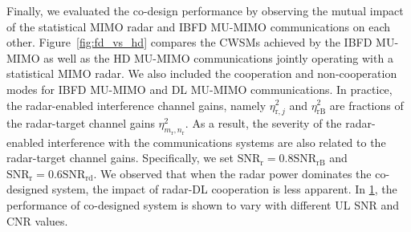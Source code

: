 \documentclass[10pt,journal]{IEEEtran}
\newcommand{\paren}[1]{\left({#1}\right)}
\newcommand{\rr}{_\mathrm{r}}
\theoremstyle{definition}
\begin{document}
{\begin{figure}[t]
\label{fig:joint}
\end{figure}

Finally, we evaluated the co-design performance by observing the mutual impact of the statistical MIMO radar and IBFD MU-MIMO communications on each other. Figure~\ref{fig:fd_vs_hd} compares the CWSMs achieved by the IBFD MU-MIMO as well as the HD MU-MIMO communications jointly operating with a statistical MIMO radar. We also included the cooperation and non-cooperation modes for IBFD MU-MIMO and DL MU-MIMO communications. In practice, the radar-enabled interference channel gains, namely $\eta^2_{\mathrm{r},j}$ and $\eta^2_{\mathrm{rB}}$ are fractions of the radar-target channel gains $\eta^2_{m\rr,n\rr}$. As a result, the severity of the radar-enabled interference with the communications systems are also related to the radar-target channel gains. Specifically, we set $\mathrm{SNR}_{\textrm{r}}=0.8\mathrm{SNR}_{\textrm{rB}}$ and $\mathrm{SNR}_{\textrm{r}}=0.6\mathrm{SNR}_{\textrm{rd}}$. We observed that when the radar power dominates the co-designed system, the impact of radar-DL cooperation is less apparent. In \figurename{\;\ref{fig:joint}}, the performance of co-designed system is shown to vary with different UL SNR and CNR values.  %
}
\end{document}
